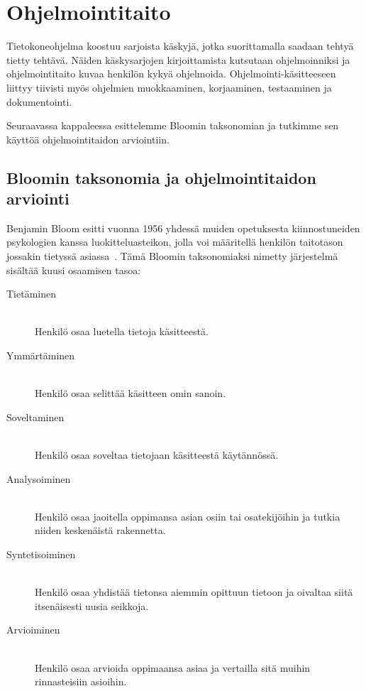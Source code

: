 \documentclass[finnish]{../tktltiki2}
\theoremstyle{definition}
\theoremstyle{remark}
\begin{document}
\section{Ohjelmointitaito}

Tietokoneohjelma koostuu sarjoista käskyjä, jotka suorittamalla saadaan tehtyä tietty tehtävä. Näiden käskysarjojen kirjoittamista kutsutaan ohjelmoinniksi ja ohjelmointitaito kuvaa henkilön kykyä ohjelmoida. Ohjelmointi-käsitteeseen liittyy tiivisti myös ohjelmien muokkaaminen, korjaaminen, testaaminen ja dokumentointi.

Seuraavassa kappaleessa esittelemme Bloomin taksonomian ja tutkimme sen käyttöä ohjelmointitaidon arviointiin.

\subsection{Bloomin taksonomia ja ohjelmointitaidon arviointi}

Benjamin Bloom esitti vuonna 1956 yhdessä muiden opetuksesta kiinnostuneiden psykologien kanssa luokitteluasteikon, jolla voi määritellä henkilön taitotason jossakin tietyssä asiassa~\cite{BLOOM56}. Tämä Bloomin taksonomiaksi nimetty järjestelmä sisältää kuusi osaamisen tasoa:

\begin{description}
  \item[Tietäminen] \hfill \\
  Henkilö osaa luetella tietoja käsitteestä.
  \item[Ymmärtäminen] \hfill \\
  Henkilö osaa selittää käsitteen omin sanoin.
  \item[Soveltaminen] \hfill \\
  Henkilö osaa soveltaa tietojaan käsitteestä käytännössä.
  \item[Analysoiminen] \hfill \\
  Henkilö osaa jaoitella oppimansa asian osiin tai osatekijöihin ja tutkia niiden keskenäistä rakennetta.
  \item[Syntetisoiminen] \hfill \\
  Henkilö osaa yhdistää tietonsa aiemmin opittuun tietoon ja oivaltaa siitä itsenäisesti uusia seikkoja.
  \item[Arvioiminen] \hfill \\
  Henkilö osaa arvioida oppimaansa asiaa ja vertailla sitä muihin rinnasteisiin asioihin.
\end{description}
\end{document}

